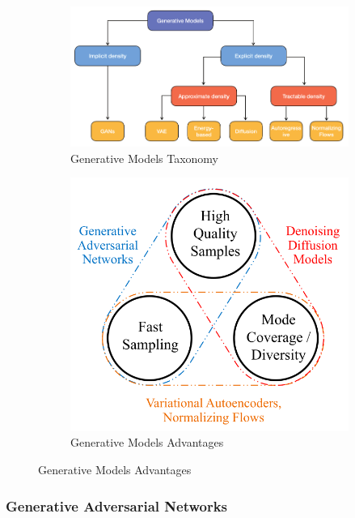 \documentclass{article}
\begin{document}
\begin{figure}[h]
    \centering
    \begin{subfigure}{.6\textwidth}
	\centering
	\includegraphics[width=.9\linewidth]{figures/generative-models-taxonomy.png}
	\caption{Generative Models Taxonomy}
	\label{fig:generative-models-taxonomy}
    \end{subfigure}%
    \begin{subfigure}{.4\textwidth}
	\centering
	\includegraphics[width=.75\linewidth]{figures/generative-models-advantages.png}
	\caption{Generative Models Advantages}
	\label{fig:generative-models-advantages}
    \end{subfigure}
\end{figure}

\subsubsection{Generative Adversarial Networks}
\end{document}

